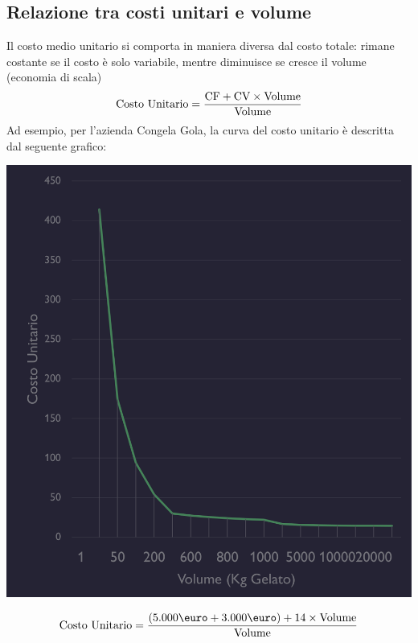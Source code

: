 \documentclass{article}
\begin{document}
\subsection{Relazione tra costi unitari e volume}
Il costo medio unitario si comporta in maniera diversa dal costo totale: rimane costante se il costo è solo variabile, mentre diminuisce se cresce il volume (economia di scala)
\[
    \text{Costo Unitario} = \frac{\text{CF} + \text{CV} \times \text{Volume}}{\text{Volume}}
\]
Ad esempio, per l'azienda Congela Gola, la curva del costo unitario è descritta dal seguente grafico:
\begin{center}
    \includegraphics[scale=0.3]{Image/CostoUni_1.png}
\end{center}
\[
    \T{Costo Unitario} = \frac{(5.000 \T{\euro} + 3.000 \T{\euro}) + 14 \times \T{Volume}}{\T{Volume}}
\]
\end{document}
